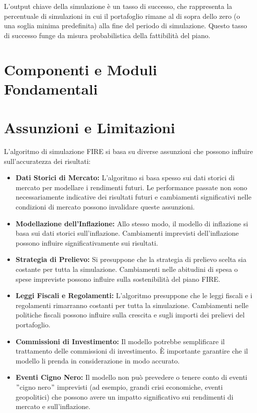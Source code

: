 \documentclass{article}
\begin{document}
    L'output chiave della simulazione è un tasso di successo, che rappresenta la
    percentuale di simulazioni in cui il portafoglio rimane al di sopra dello
    zero (o una soglia minima predefinita) alla fine del periodo di simulazione.
    Questo tasso di successo funge da misura probabilistica della fattibilità
    del piano.

    \section{Componenti e Moduli
    Fondamentali}\label{sec:componenti-e-moduli-fondamentali}
    

    \section{Assunzioni e Limitazioni}\label{sec:assunzioni-e-limitazioni}

L'algoritmo di simulazione FIRE si basa su diverse assunzioni che possono
influire sull'accuratezza dei risultati:
    \begin{itemize}
        \item \textbf{Dati Storici di Mercato:} L'algoritmo si basa spesso sui
        dati storici di mercato per modellare i rendimenti futuri.
        Le
        performance passate non sono necessariamente indicative dei risultati
        futuri e cambiamenti significativi nelle condizioni di mercato possono
        invalidare queste assunzioni.
        \item \textbf{Modellazione dell'Inflazione:} Allo stesso modo, il
        modello di inflazione si basa sui dati storici sull'inflazione.
        Cambiamenti imprevisti dell'inflazione possono influire
        significativamente sui risultati.
        \item \textbf{Strategia di Prelievo:} Si presuppone che la strategia di
        prelievo scelta sia costante per tutta la simulazione.
        Cambiamenti nelle
        abitudini di spesa o spese impreviste possono influire sulla
        sostenibilità del piano FIRE\@.
        \item \textbf{Leggi Fiscali e Regolamenti:} L'algoritmo presuppone che
        le leggi fiscali e i regolamenti rimarranno costanti per tutta la
        simulazione.
        Cambiamenti nelle politiche fiscali possono influire sulla
        crescita e sugli importi dei prelievi del portafoglio.
        \item \textbf{Commissioni di Investimento:} Il modello potrebbe
        semplificare il trattamento delle commissioni di investimento.
        È
        importante garantire che il modello li prenda in considerazione in modo
        accurato.
        \item \textbf{Eventi Cigno Nero:} Il modello non può prevedere o tenere
        conto di eventi \("\)cigno nero\("\) imprevisti (ad esempio, grandi
        crisi economiche, eventi geopolitici) che possono avere un impatto
        significativo sui rendimenti di mercato e sull'inflazione.
    \end{itemize}
\end{document}
